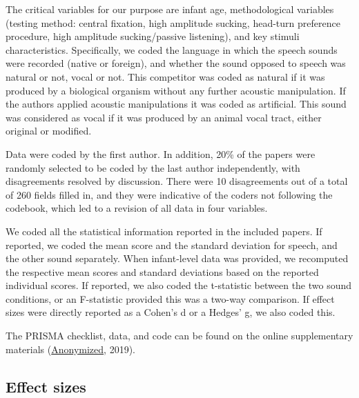 \documentclass[man,floatsintext]{apa6}
\begin{document}
The critical variables for our purpose are infant age, methodological variables (testing method: central fixation, high amplitude sucking, head-turn preference procedure, high amplitude sucking/passive listening), and key stimuli characteristics. Specifically, we coded the language in which the speech sounds were recorded (native or foreign), and whether the sound opposed to speech was natural or not, vocal or not. This competitor was coded as natural if it was produced by a biological organism without any further acoustic manipulation. If the authors applied acoustic manipulations it was coded as artificial. This sound was considered as vocal if it was produced by an animal vocal tract, either original or modified.

Data were coded by the first author. In addition, 20\% of the papers were randomly selected to be coded by the last author independently, with disagreements resolved by discussion. There were 10 disagreements out of a total of 260 fields filled in, and they were indicative of the coders not following the codebook, which led to a revision of all data in four variables.

We coded all the statistical information reported in the included papers. If reported, we coded the mean score and the standard deviation for speech, and the other sound separately. When infant-level data was provided, we recomputed the respective mean scores and standard deviations based on the reported individual scores. If reported, we also coded the t-statistic between the two sound conditions, or an F-statistic provided this was a two-way comparison. If effect sizes were directly reported as a Cohen's d or a Hedges' g, we also coded this.

The PRISMA checklist, data, and code can be found on the online supplementary materials (\href{https://osf.io/4stz9/?view_only=d0696591ebf34bfc8430f848cd945ca8}{Anonymized}, 2019).

\hypertarget{effect-sizes}{%
\subsection{Effect sizes}\label{effect-sizes}}
\end{document}
